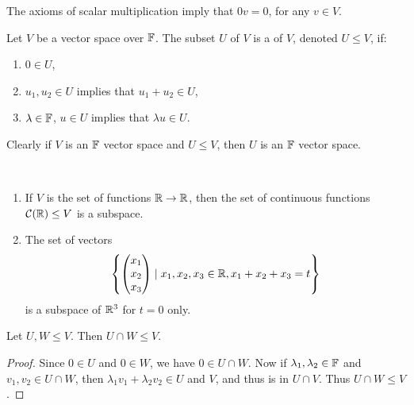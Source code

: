 \documentclass[a4paper]{scrartcl}
\begin{document}
\begin{remark}
    The axioms of scalar multiplication imply that $0v = 0$, for any $v \in V$.
\end{remark}

\begin{definition}[Subspace]
    Let $V$ be a vector space over $\mathbb{F}$. The subset $U$ of $V$ is a  of $V$, denoted $U \leq V$, if:
    \begin{enumerate}[label=(\roman*)]
        \item $0 \in U$,
        \item $u_1, u_2 \in U$ implies that $u_1 + u_2 \in U$,
        \item $\lambda \in \mathbb{F}$, $u \in U$ implies that $\lambda u \in U$.
    \end{enumerate}
\end{definition}

Clearly if $V$ is an $\mathbb{F}$ vector space and $U \leq V$, then $U$ is an $\mathbb{F}$ vector space.

\begin{example}~
    \vspace{-1.5\baselineskip}
    \begin{enumerate}[label=(\roman*)]
        \item If $V$ is the set of functions $\mathbb{R} \rightarrow \mathbb{R}$, then the set of continuous functions $\mathcal{C}(\mathbb{R}) \leq V$ is a subspace.
        \item The set of vectors
        $$
        \left\{\begin{pmatrix}x_1 \\ x_2 \\ x_3\end{pmatrix} \mid x_1, x_2, x_3 \in \mathbb{R}, x_1 + x_2 + x_3 = t\right\}
        $$
        is a subspace of $\mathbb{R}^3$ for $t = 0$ only.
    \end{enumerate}
\end{example}

\begin{proposition}
    Let $U, W \leq V$. Then $U \cap W \leq V$.
\end{proposition}
\begin{proof}
    Since $0 \in U$ and $0 \in W$, we have $0 \in U \cap W$. Now if $\lambda_1, \lambda_2 \in \mathbb{F}$ and $v_1, v_2 \in U \cap W$, then $\lambda_1 v_1 + \lambda_2 v_2 \in U$ and $V$, and thus is in $U \cap V$. Thus $U \cap W \leq V$.
\end{proof}
\end{document}
